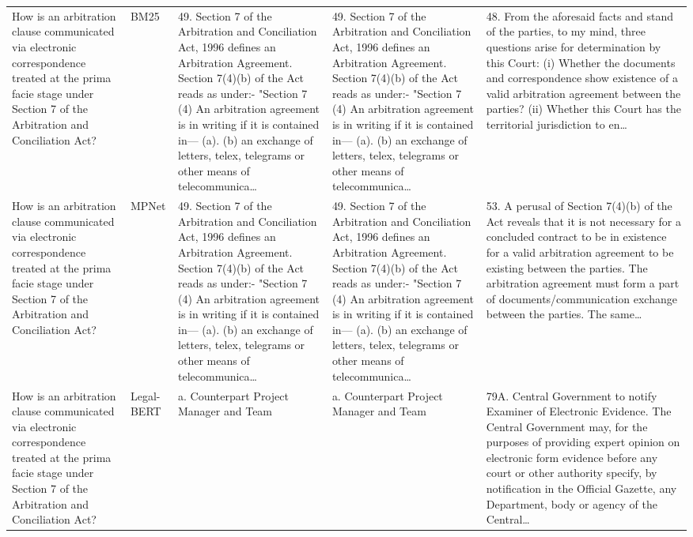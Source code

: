 \documentclass[11pt]{article}
\begin{document}
\begin{xltabular}{\textwidth}{|p{3.2cm}|p{2.2cm}|Y|Y|Y|}
        How is an arbitration clause communicated via electronic correspondence treated at the prima facie stage under Section 7 of the Arbitration and Conciliation Act? & BM25 & 49. Section 7 of the Arbitration and Conciliation Act, 1996 defines an Arbitration Agreement. Section 7(4)(b) of the Act reads as under:-  "Section 7  (4) An arbitration agreement is in writing if it is contained in—  (a). (b) an exchange of letters, telex, telegrams or other means of telecommunica… & 49. Section 7 of the Arbitration and Conciliation Act, 1996 defines an Arbitration Agreement. Section 7(4)(b) of the Act reads as under:-  "Section 7  (4) An arbitration agreement is in writing if it is contained in—  (a). (b) an exchange of letters, telex, telegrams or other means of telecommunica… & 48. From the aforesaid facts and stand of the parties, to my mind, three questions arise for determination by this Court:  (i) Whether the documents and correspondence show existence of a valid arbitration agreement between the parties? (ii) Whether this Court has the territorial jurisdiction to en… \\ 
        How is an arbitration clause communicated via electronic correspondence treated at the prima facie stage under Section 7 of the Arbitration and Conciliation Act? & MPNet & 49. Section 7 of the Arbitration and Conciliation Act, 1996 defines an Arbitration Agreement. Section 7(4)(b) of the Act reads as under:-  "Section 7  (4) An arbitration agreement is in writing if it is contained in—  (a). (b) an exchange of letters, telex, telegrams or other means of telecommunica… & 49. Section 7 of the Arbitration and Conciliation Act, 1996 defines an Arbitration Agreement. Section 7(4)(b) of the Act reads as under:-  "Section 7  (4) An arbitration agreement is in writing if it is contained in—  (a). (b) an exchange of letters, telex, telegrams or other means of telecommunica… & 53. A perusal of Section 7(4)(b) of the Act reveals that it is not necessary for a concluded contract to be in existence for a valid arbitration agreement to be existing between the parties. The arbitration agreement must form a part of documents/communication exchange between the parties. The same… \\ 
        How is an arbitration clause communicated via electronic correspondence treated at the prima facie stage under Section 7 of the Arbitration and Conciliation Act? & Legal-BERT & a. Counterpart Project Manager and Team & a. Counterpart Project Manager and Team & 79A. Central Government to notify Examiner of Electronic Evidence. The Central Government may, for the purposes of providing expert opinion on electronic form evidence before any court or other authority specify, by notification in the Official Gazette, any Department, body or agency of the Central… \\ 

\end{xltabular}
\end{document}

